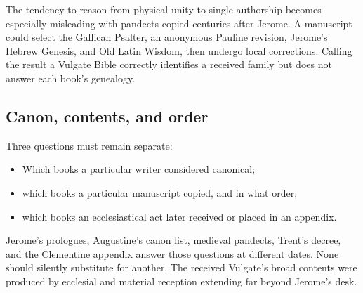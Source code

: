 The tendency to reason from physical unity to single authorship becomes especially misleading with pandects copied centuries after Jerome. A manuscript could select the Gallican Psalter, an anonymous Pauline revision, Jerome's Hebrew Genesis, and Old Latin Wisdom, then undergo local corrections. Calling the result a Vulgate Bible correctly identifies a received family but does not answer each book's genealogy.

\subsection{Canon, contents, and order}

Three questions must remain separate:

\begin{itemize}
\item Which books a particular writer considered canonical;
\item which books a particular manuscript copied, and in what order;
\item which books an ecclesiastical act later received or placed in an appendix.
\end{itemize}

Jerome's prologues, Augustine's canon list, medieval pandects, Trent's decree, and the Clementine appendix answer those questions at different dates. None should silently substitute for another. The received Vulgate's broad contents were produced by ecclesial and material reception extending far beyond Jerome's desk.

